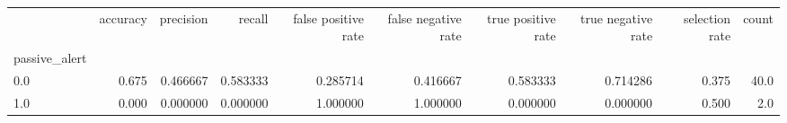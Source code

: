 \begin{tabular}{lrrrrrrrrr}
\toprule
{} &  accuracy &  precision &    recall &  false positive rate &  false negative rate &  true positive rate &  true negative rate &  selection rate &  count \\
passive\_alert &           &            &           &                      &                      &                     &                     &                 &        \\
\midrule
0.0           &     0.675 &   0.466667 &  0.583333 &             0.285714 &             0.416667 &            0.583333 &            0.714286 &           0.375 &   40.0 \\
1.0           &     0.000 &   0.000000 &  0.000000 &             1.000000 &             1.000000 &            0.000000 &            0.000000 &           0.500 &    2.0 \\
\bottomrule
\end{tabular}
